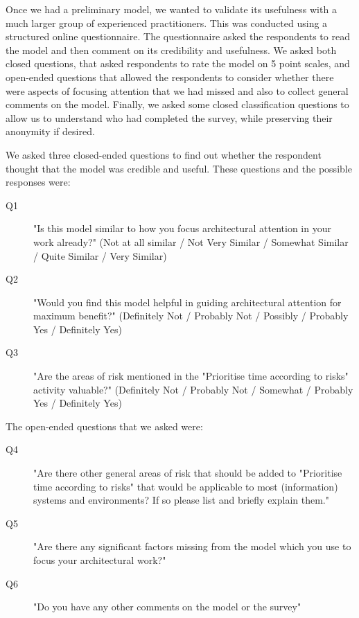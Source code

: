 Once we had a preliminary model, we wanted to validate its usefulness with a much larger group of experienced practitioners.  This was conducted using a structured online questionnaire.  The questionnaire asked the respondents to read the model and then comment on its credibility and usefulness.  We asked both closed questions, that asked respondents to rate the model on 5 point scales, and open-ended questions that allowed the respondents to consider whether there were aspects of focusing attention that we had missed and also to collect general comments on the model.  Finally, we asked some closed classification questions to allow us to understand who had completed the survey, while preserving their anonymity if desired.

We asked three closed-ended questions to find out whether the respondent thought that the model was credible and useful.  These questions and the possible responses were:

\begin{description}
	\item [Q1] "Is this model similar to how you focus architectural attention in your work already?" (Not at all similar / Not Very Similar / Somewhat Similar / Quite Similar / Very Similar)
	\item [Q2] "Would you find this model helpful in guiding architectural attention for maximum benefit?" (Definitely Not / Probably Not / Possibly / Probably Yes / Definitely Yes)
	\item [Q3] "Are the areas of risk mentioned in the "Prioritise time according to risks" activity valuable?" (Definitely Not / Probably Not / Somewhat / Probably Yes / Definitely Yes)
\end{description}

The open-ended questions that we asked were:

\begin{description}
	\item [Q4] "Are there other general areas of risk that should be added to "Prioritise time according to risks" that would be applicable to most (information) systems and environments? If so please list and briefly explain them."
	\item [Q5] "Are there any significant factors missing from the model which you use to focus your architectural work?"
	\item [Q6] "Do you have any other comments on the  model or the survey"
\end{description}

